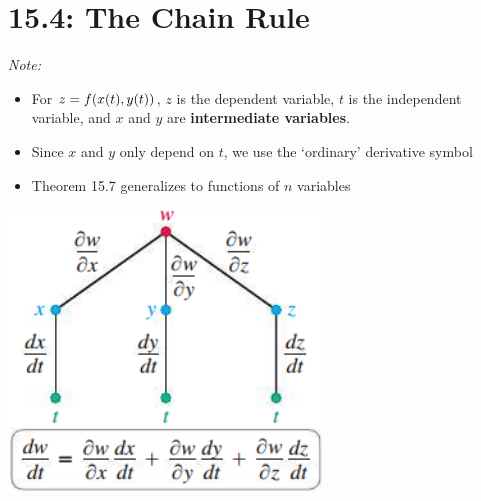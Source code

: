 \documentclass[mathNotesPreamble]{subfiles}
\begin{document}
\section{15.4: The Chain Rule}

  \noindent
  \vspace*{\baselineskip}

  \noindent
  \begin{minipage}{0.65\linewidth}
  \textit{Note:} 
    \begin{itemize}
      \item For $z=f{\left(x(t), y(t)\right)}$, $z$ is the dependent variable, $t$ is the independent variable, and $x$ and $y$ are \newline\textbf{intermediate variables}.
      \item Since $x$ and $y$ only depend on $t$, we use the `ordinary' derivative symbol
      \item Theorem 15.7 generalizes to functions of $n$ variables
    \end{itemize}
  \end{minipage}%
  \begin{minipage}{0.35\linewidth}
    \begin{flushright}
      \includegraphics[width=0.9\linewidth]{images/briggs_15_04/fig15_37}
    \end{flushright}
  \end{minipage}
  \vspace*{\baselineskip}
\end{document}
